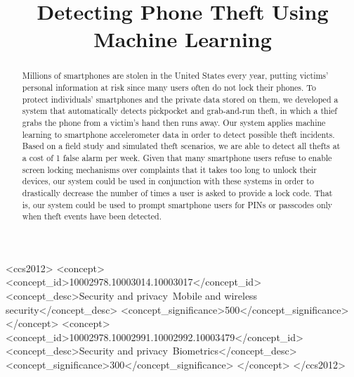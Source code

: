 \documentclass[sigconf, anonymous]{acmart}
\begin{document}
\title{Detecting Phone Theft Using Machine Learning} %


\begin{abstract}
Millions of smartphones are stolen in the United States every year, putting victims' personal information at risk since many users often do not lock their phones.
To protect individuals' smartphones and the private data stored on them, we developed a system that automatically detects pickpocket and grab-and-run theft, in which a thief grabs the phone from a victim's hand then runs away.
Our system applies machine learning to smartphone accelerometer data in order to detect possible theft incidents. Based on a field study and simulated theft scenarios, we are able to detect all thefts at a cost of 1 false alarm per week. Given that many smartphone users refuse to enable screen locking mechanisms over complaints that it takes too long to unlock their devices, our system could be used in conjunction with these systems in order to drastically decrease the number of times a user is asked to provide a lock code. That is, our system could be used to prompt smartphone users for PINs or passcodes only when theft events have been detected.
\end{abstract}

\begin{CCSXML}
<ccs2012>
<concept>
<concept_id>10002978.10003014.10003017</concept_id>
<concept_desc>Security and privacy~Mobile and wireless security</concept_desc>
<concept_significance>500</concept_significance>
</concept>
<concept>
<concept_id>10002978.10002991.10002992.10003479</concept_id>
<concept_desc>Security and privacy~Biometrics</concept_desc>
<concept_significance>300</concept_significance>
</concept>
</ccs2012>
\end{CCSXML}
\end{document}
